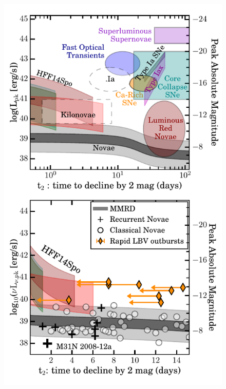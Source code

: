 \documentclass{nature_arxiv}
\begin{document}
\begin{multicols}{2}
\begin{figure}[tbp]
\begin{center}
\includegraphics[width=1\columnwidth]{./figures/peakluminosity_vs_declinetime/peakluminosity_vs_declinetime}
\caption{ \protect}
\end{center}
\end{figure}


\end{multicols}
\end{document}
